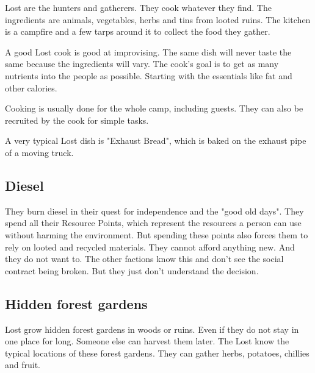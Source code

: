 Lost are the hunters and gatherers. They cook whatever they find. The ingredients are animals, vegetables, herbs and tins from looted ruins. The kitchen is a campfire and a few tarps around it to collect the food they gather.

A good Lost cook is good at improvising. The same dish will never taste the same because the ingredients will vary. The cook's goal is to get as many nutrients into the people as possible. Starting with the essentials like fat and other calories.

Cooking is usually done for the whole camp, including guests. They can also be recruited by the cook for simple tasks.

A very typical Lost dish is "Exhaust Bread", which is baked on the exhaust pipe of a moving truck.


\subsection{Diesel}

They burn diesel in their quest for independence and the "good old days". They spend all their Resource Points, which represent the resources a person can use without harming the environment. But spending these points also forces them to rely on looted and recycled materials. They cannot afford anything new. And they do not want to.
The other factions know this and don't see the social contract being broken. But they just don't understand the decision.


\subsection{Hidden forest gardens}

Lost grow hidden forest gardens in woods or ruins. Even if they do not stay in one place for long. Someone else can harvest them later.
The Lost know the typical locations of these forest gardens. They can gather herbs, potatoes, chillies and fruit.

